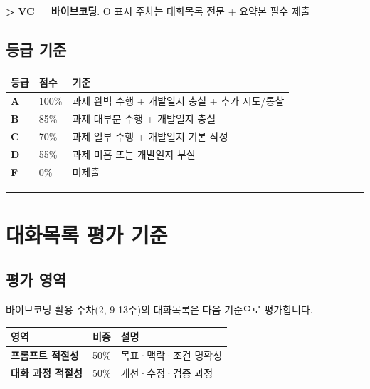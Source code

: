 \documentclass[11pt, a4paper]{article}
\newcommand{\note}[1]{%
    \vspace{3pt}
    \noindent\textcolor{textgray}{\textbf{>} #1}
    \vspace{3pt}
}
\begin{document}
\note{\textbf{VC = 바이브코딩}. O 표시 주차는 대화목록 전문 + 요약본 필수 제출}

\subsection{등급 기준}

\begin{table}[h]
\centering
\begin{tabular}{|C{1.5cm}|C{1.5cm}|L{10cm}|}
\hline
{}
\textbf{등급} & \textbf{점수} & \textbf{기준} \\
\hline
\textbf{A} & 100\% & 과제 완벽 수행 + 개발일지 충실 + 추가 시도/통찰 \\
\hline
\textbf{B} & 85\% & 과제 대부분 수행 + 개발일지 충실 \\
\hline
\textbf{C} & 70\% & 과제 일부 수행 + 개발일지 기본 작성 \\
\hline
\textbf{D} & 55\% & 과제 미흡 또는 개발일지 부실 \\
\hline
\textbf{F} & 0\% & 미제출 \\
\hline
\end{tabular}
\end{table}

\vspace{3pt}
\noindent\rule{\textwidth}{0.3pt}

\section{대화목록 평가 기준}

\subsection{평가 영역}

바이브코딩 활용 주차(2, 9-13주)의 대화목록은 다음 기준으로 평가합니다.

\begin{table}[h]
\centering
\begin{tabular}{|L{4cm}|C{2cm}|L{7.5cm}|}
\hline
{}
\textbf{영역} & \textbf{비중} & \textbf{설명} \\
\hline
\textbf{프롬프트 적절성} & 50\% & 목표·맥락·조건 명확성 \\
\hline
\textbf{대화 과정 적절성} & 50\% & 개선·수정·검증 과정 \\
\hline
\end{tabular}
\end{table}
\end{document}
